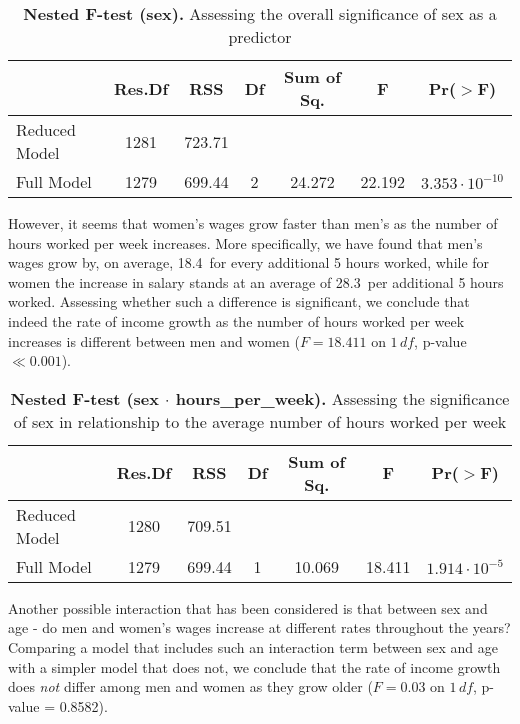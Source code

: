 \documentclass{article}
\newcommand*\pct{\scalebox{.85}{\%}}
\begin{document}
\begin{table}[h]
\centering
\begin{tabular}{lcccccc}
  \toprule
  & Res.Df & RSS & Df & Sum of Sq. & F & Pr($>$F) \\ 
  \midrule
  Reduced Model & 1281 & 723.71 &  &  &  &  \\ 
  Full Model & 1279 & 699.44 & 2 & 24.272 & 22.192 & $3.353 \cdot 10^{-10}$ \\ 
  \bottomrule
\end{tabular}
\caption{\textbf{Nested F-test (sex).} Assessing the overall significance of sex as a predictor}
\label{f_test_1}
\end{table}

However, it seems that women's wages grow faster than men's as the number of hours worked per week increases. More specifically, we have found that men's wages grow by, on average, 18.4\pct \, for every additional 5 hours worked, while for women the increase in salary stands at an average of 28.3\pct \, per additional 5 hours worked. Assessing whether such a difference is significant, we conclude that indeed the rate of income growth as the number of hours worked per week increases is different between men and women ($F = 18.411$ on $1 \, df$, p-value $\ll 0.001$).

\begin{table}[h]
\centering
\begin{tabular}{lcccccc}
  \toprule
  & Res.Df & RSS & Df & Sum of Sq. & F & Pr($>$F) \\ 
  \midrule
  Reduced Model & 1280 & 709.51 &  &  &  &  \\ 
  Full Model & 1279 & 699.44 & 1 & 10.069 & 18.411 & $1.914 \cdot 10^{-5}$ \\ 
  \bottomrule
\end{tabular}
\caption{\textbf{Nested F-test (sex $\cdot$ hours\_per\_week).} Assessing the significance of sex in relationship to the average number of hours worked per week}
\label{f_test_2}
\end{table}

Another possible interaction that has been considered is that between sex and age - do men and women's wages increase at different rates throughout the years? Comparing a model that includes such an interaction term between sex and age with a simpler model that does not, we conclude that the rate of income growth does \textit{not} differ among men and women as they grow older ($F = 0.03$ on $1 \, df$, p-value = 0.8582).
\end{document}
